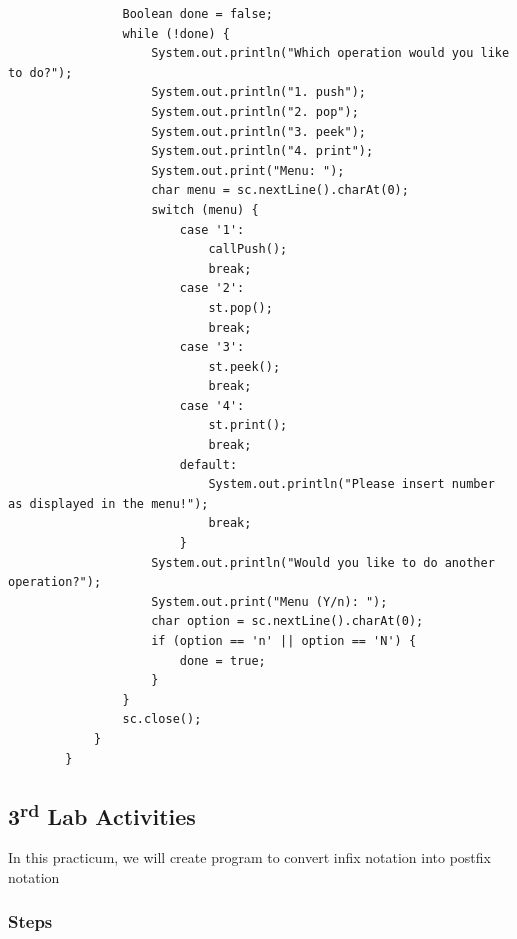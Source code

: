 \documentclass[12pt,titlepage]{article}
\begin{document}
\begin{enumerate}
\begin{verbatim}
                Boolean done = false;
                while (!done) {
                    System.out.println("Which operation would you like to do?");
                    System.out.println("1. push");
                    System.out.println("2. pop");
                    System.out.println("3. peek");
                    System.out.println("4. print");
                    System.out.print("Menu: ");
                    char menu = sc.nextLine().charAt(0);
                    switch (menu) {
                        case '1':
                            callPush();
                            break;
                        case '2':
                            st.pop();
                            break;
                        case '3':
                            st.peek();
                            break;
                        case '4':
                            st.print();
                            break;
                        default:
                            System.out.println("Please insert number as displayed in the menu!");
                            break;
                        }
                    System.out.println("Would you like to do another operation?");
                    System.out.print("Menu (Y/n): ");
                    char option = sc.nextLine().charAt(0);
                    if (option == 'n' || option == 'N') {
                        done = true;
                    }
                }
                sc.close();
            }
        }
    \end{verbatim}
\end{enumerate}

\subsection{3\textsuperscript{rd} Lab Activities}

In this practicum, we will create program to convert infix notation into postfix notation

\subsubsection{Steps}
\end{document}
